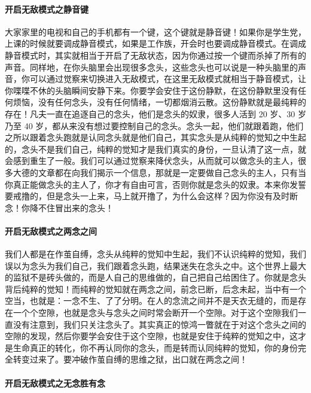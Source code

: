 \paragraph{开启无敌模式之静音键}

大家家里的电视和自己的手机都有一个键，这个键就是静音键！如果你是学生党，上课的时候就要调成静音模式，如果是工作族，开会时也要调成静音模式。在调成静音模式时，其实就相当于开启了无敌状态，因为你通过按一个键而杀掉了所有的声音。同样地，在你头脑里会出现很多念头，这些念头也可以说是一种头脑里的声音，你可以通过觉察来切换进入无敌模式，在这里无敌模式就相当于静音模式，让你喋喋不休的头脑瞬间安静下来。你要学会安住于这份静默，在这份静默里没有任何烦恼，没有任何念头，没有任何情绪，一切都烟消云散。这份静默就是最纯粹的存在！凡夫一直在追逐自己的念头，他们是念头的奴隶，很多人活到 20 岁、30 岁乃至 40 岁，都从来没有想过要控制自己的念头。念头一起，他们就跟着跑，他们之所以跟着念头跑就是认同念头就是他们自己，其实念头是从纯粹的觉知之中生起的，念头不是我们自己，纯粹的觉知才是我们真实的身份，一旦认清了这一点，就会感到重生了一般。我们可以通过觉察来降伏念头，从而就可以做念头的主人，很多大德的文章都在向我们揭示一个信息，那就是一定要做自己念头的主人，只有当你真正能做念头的主人了，你才有自由可言，否则你就是念头的奴隶。本来你发誓要戒撸的，但是念头一上来，马上就开撸了，为什么会这样？因为你没有及时断念！你降不住冒出来的念头！

\paragraph{开启无敌模式之两念之间}

我们人都是在作茧自缚，念头从纯粹的觉知中生起，我们不认识纯粹的觉知，我们误以为念头为我们自己，我们跟着念头跑，结果迷失在念头之中。这个世界上最大的监狱不是砖头做的，而是人自己的思维做的，自己把自己给困住了。你就是念头背后纯粹的觉知！而纯粹的觉知就在两念之间，前念已断，后念未起，当中有一个空当，也就是：一念不生、了了分明。在人的念流之间并不是天衣无缝的，而是存在一个个空隙，也就是念头与念头之间时常会断开一个空隙。对于这个空隙我们一直没有注意到，我们只关注念头了。其实真正的惊鸿一瞥就在于对这个念头之间的空隙的发现，然后你要学会安住于这个空隙，也就是安住于纯粹的觉知之中，这才是生命真正的转化，你不再认同你的念头，而是转而认同纯粹的觉知，你的身份完全转变过来了。要冲破作茧自缚的思维之狱，出口就在两念之间！

\paragraph{开启无敌模式之无念胜有念}

